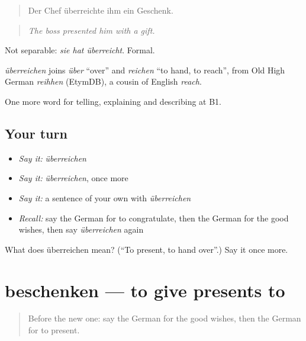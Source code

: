 \begin{quote}
Der Chef überreichte ihm ein Geschenk.
\end{quote}

\begin{quote}
\emph{The boss presented him with a gift.}
\end{quote}

Not separable: \emph{sie hat überreicht}. Formal.

\begin{cousinweb}
\emph{überreichen} joins \emph{über} \textquotedblleft{}over\textquotedblright{} and \emph{reichen} \textquotedblleft{}to hand, to reach\textquotedblright{}, from Old High German \emph{reihhen} (EtymDB), a cousin of English \emph{reach}.
\end{cousinweb}

\begin{grammarlens}[title={What you've built}]
One more word for telling, explaining and describing at B1.
\end{grammarlens}

\subsection*{Your turn}
\begin{itemize}
\raggedright
  \item \emph{Say it:} \emph{überreichen}
  \item \emph{Say it:} \emph{überreichen}, once more
  \item \emph{Say it:} a sentence of your own with \emph{überreichen}
  \item \emph{Recall:} say the German for to congratulate, then the German for the good wishes, then say \emph{überreichen} again
\end{itemize}

\begin{tcolorbox}[breakable,colback=teal!4,colframe=teal!35!black,title={Before you move on}]
What does überreichen mean? (\textquotedblleft{}To present, to hand over\textquotedblright{}.) Say it once more.
\end{tcolorbox}
\section[beschenken]{beschenken — to give presents to}

\label{lesson:GE-C306-beschenken}



\begin{quote}
Before the new one: say the German for the good wishes, then the German for to present.
\end{quote}

